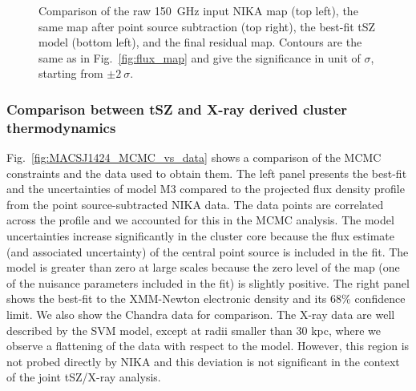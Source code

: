 \documentclass[twocolumn,traditabstract]{aa}
\begin{document}
\begin{figure}[h]
\caption{\footnotesize Comparison of the raw 150~GHz input NIKA map (top left), the same map after point source subtraction (top right), the best-fit tSZ model (bottom left), and the final residual map. Contours are the same as in Fig.~\ref{fig:flux_map} and give the significance in unit of $\sigma$, starting from $\pm 2 \ \sigma$. }
\label{fig:MACSJ1424_MCMC_modeling}
\end{figure}

\subsubsection{Comparison between tSZ and X-ray derived cluster thermodynamics}
Fig.~\ref{fig:MACSJ1424_MCMC_vs_data} shows a comparison of the MCMC constraints and the data used to obtain them. The left panel presents the best-fit and the uncertainties of model M3 compared to the projected flux density profile from the point source-subtracted NIKA data. The data points are correlated across the profile and we accounted for this in the MCMC analysis. The model uncertainties increase significantly in the cluster core because the flux estimate (and associated uncertainty) of the central point source is included in the fit. The model is greater than zero at large scales because the zero level of the map (one of the nuisance parameters included in the fit) is slightly positive. The right panel shows the best-fit to the XMM-Newton electronic density and its 68\% confidence limit. We also show the Chandra data for comparison. The X-ray data are well described by the SVM model, except at radii smaller than 30 kpc, where we observe a flattening of the data with respect to the model. However, this region is not probed directly by NIKA and this deviation is not significant in the context of the joint tSZ/X-ray analysis.
\end{document}
